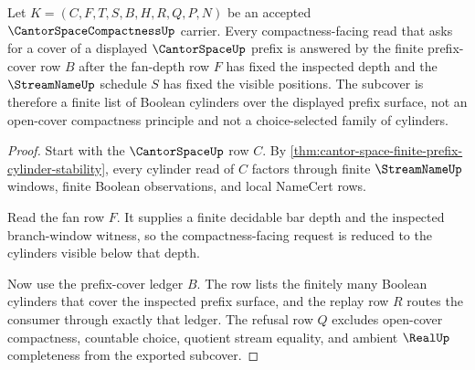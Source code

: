 \begin{theorem}
\label{thm:cantor-space-compactness-finite-prefix-subcover}
Let $K=(C,F,T,S,B,H,R,Q,P,N)$ be an accepted $\CantorSpaceCompactnessUp$ carrier. Every compactness-facing read that asks for a cover of a displayed $\CantorSpaceUp$ prefix is answered by the finite prefix-cover row $B$ after the fan-depth row $F$ has fixed the inspected depth and the $\StreamNameUp$ schedule $S$ has fixed the visible positions. The subcover is therefore a finite list of Boolean cylinders over the displayed prefix surface, not an open-cover compactness principle and not a choice-selected family of cylinders.
\end{theorem}
\begin{proof}
Start with the $\CantorSpaceUp$ row $C$. By \autoref{thm:cantor-space-finite-prefix-cylinder-stability}, every cylinder read of $C$ factors through finite $\StreamNameUp$ windows, finite Boolean observations, and local NameCert rows.

Read the fan row $F$. It supplies a finite decidable bar depth and the inspected branch-window witness, so the compactness-facing request is reduced to the cylinders visible below that depth.

Now use the prefix-cover ledger $B$. The row lists the finitely many Boolean cylinders that cover the inspected prefix surface, and the replay row $R$ routes the consumer through exactly that ledger. The refusal row $Q$ excludes open-cover compactness, countable choice, quotient stream equality, and ambient $\RealUp$ completeness from the exported subcover.
\end{proof}

